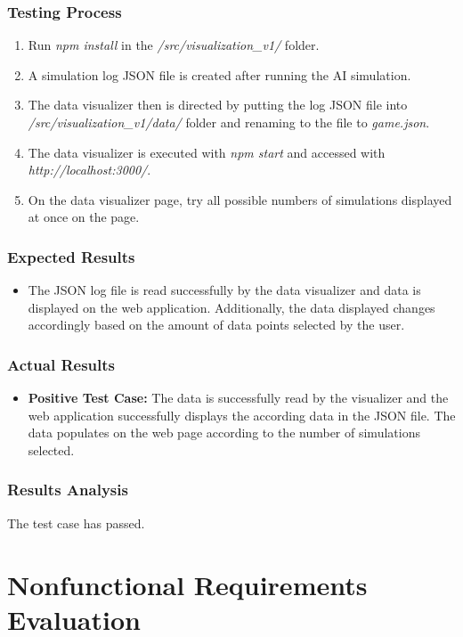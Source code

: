\documentclass[12pt, titlepage]{article}
\providecommand{\DIFaddbegin}{} %
\providecommand{\DIFaddend}{} %
\begin{document}
\subsubsection{Testing Process}
\begin{enumerate}
    \item Run \textit{npm install} in the \textit{/src/visualization\_v1/} folder.
    \item A simulation log JSON file is created after running the AI simulation.
    \item The data visualizer then is directed by putting the log JSON file into \textit{/src/visualization\_v1/data/} folder and renaming to the file to \textit{game.json}.
    \item The data visualizer is executed with \textit{npm start} and accessed with \textit{http://localhost:3000/}.
    \item On the data visualizer page, try all possible numbers of simulations displayed at once on the page.
\end{enumerate}
\subsubsection{Expected Results}
\begin{itemize}
    \item The JSON log file is read successfully by the data visualizer and data is displayed on the web application. Additionally, the data displayed changes accordingly based on the amount of data points selected by the user.
\end{itemize}
\subsubsection{Actual Results}
\begin{itemize}
    \item \textbf{Positive Test Case:} The data is successfully read by the visualizer and the web application successfully displays the according data in the JSON file. The data populates on the web page according to the number of simulations selected.
\end{itemize}
\subsubsection{Results Analysis}
The test case has passed.
\DIFaddbegin 

\DIFaddend \section{Nonfunctional Requirements Evaluation}
\end{document}
